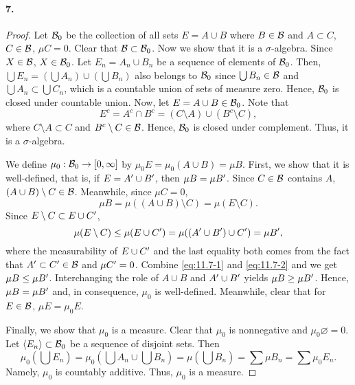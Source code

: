   \paragraph{7.}
  \begin{proof}
    Let $\mathcal{B}_0$ be the collection of all sets $E=A\cup B$ where $B\in
    \mathcal{B}$ and $A\subset C$, $C\in\mathcal{B}$, $\mu C=0$. Clear that $\mathcal{B}
    \subset\mathcal{B}_0$. Now we show that it is a $\sigma$-algebra. Since $X\in
    \mathcal{B}$, $X\in\mathcal{B}_0$. Let $E_n=A_n\cup B_n$ be a sequence of elements
    of $\mathcal{B}_0$. Then, $\bigcup E_n=(\bigcup A_n)\cup(\bigcup B_n)$ also
    belongs to $\mathcal{B}_0$ since $\bigcup B_n\in\mathcal{B}$ and $\bigcup A_n
    \subset\bigcup C_n$, which is a countable union of sets of measure zero. 
    Hence, $\mathcal{B}_0$ is closed under countable union. Now, let $E=A\cup B\in
    \mathcal{B}_0$. Note that
    \[
      E^c=A^c\cap B^c=(C\setminus A)\cup(B^c\setminus C),
    \]
    where $C\setminus A\subset C$ and $B^c\setminus C\in\mathcal{B}$. Hence, 
    $\mathcal{B}_0$ is closed under complement. Thus, it is a $\sigma$-algebra.\par
    We define $\mu_0:\mathcal{B}_0\to[0,\infty]$ by $\mu_0 E=\mu_0(A\cup B)=\mu B$.
    First, we show that it is well-defined, that is, if $E=A^\prime\cup B^\prime$, then
    $\mu B=\mu B^\prime$. Since $C\in\mathcal{B}$ contains $A$, $(A\cup B)\setminus C
    \in\mathcal{B}$. Meanwhile, since $\mu C=0$,
    \begin{equation}
      \label{eq:11.7-1}
      \mu B=\mu((A\cup B)\setminus C)=\mu(E\setminus C).
    \end{equation}
    Since $E\setminus C\subset E\cup C^\prime$,
    \begin{equation}
      \label{eq:11.7-2}
      \mu(E\setminus C)\le \mu(E\cup C^\prime)=\mu((A^\prime\cup B^\prime)\cup C^\prime)=
      \mu B^\prime,
    \end{equation}
    where the measurability of $E\cup C^\prime$ and the last equality both comes 
    from the fact that $A^\prime\subset C^\prime\in\mathcal{B}$ and $\mu C^\prime=0$. Combine
    \eqref{eq:11.7-1} and \eqref{eq:11.7-2} and we get $\mu B\le\mu B^\prime$.
    Interchanging the role of $A\cup B$ and $A^\prime\cup B^\prime$ yields $\mu B\ge
    \mu B^\prime$. Hence, $\mu B=\mu B^\prime$ and, in consequence, $\mu_0$ is
    well-defined. Meanwhile, clear that for $E\in\mathcal{B}$, $\mu E=\mu_0 E$.\par
    Finally, we show that $\mu_0$ is a measure. Clear that $\mu_0$ is 
    nonnegative and $\mu_0\varnothing=0$. Let $\langle E_n\rangle\subset
    \mathcal{B}_0$ be a sequence of disjoint sets. Then
    \[
      \mu_0\left(\bigcup E_n\right)=
      \mu_0\left(\bigcup A_n \cup \bigcup B_n\right)=
      \mu\left(\bigcup B_n\right)=
      \sum\mu B_n=
      \sum\mu_0 E_n.
    \]
    Namely, $\mu_0$ is countably additive. Thus, $\mu_0$ is a measure.
  \end{proof}
  
